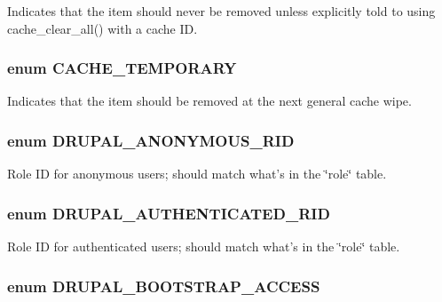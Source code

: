 Indicates that the item should never be removed unless explicitly told to using cache\_\-clear\_\-all() with a cache ID. \hypertarget{bootstrap_8inc_1f2558e91eb9f33d14168bb8dfd99690}{
\subsubsection[{CACHE\_\-TEMPORARY}]{\setlength{\rightskip}{0pt plus 5cm}enum {\bf CACHE\_\-TEMPORARY}}}
\label{bootstrap_8inc_1f2558e91eb9f33d14168bb8dfd99690}


Indicates that the item should be removed at the next general cache wipe. \hypertarget{bootstrap_8inc_c7816037c6b6b794a56dcce4dea70569}{
\subsubsection[{DRUPAL\_\-ANONYMOUS\_\-RID}]{\setlength{\rightskip}{0pt plus 5cm}enum {\bf DRUPAL\_\-ANONYMOUS\_\-RID}}}
\label{bootstrap_8inc_c7816037c6b6b794a56dcce4dea70569}


Role ID for anonymous users; should match what's in the \char`\"{}role\char`\"{} table. \hypertarget{bootstrap_8inc_c2d2d9cd4c8559510f9baa997525373e}{
\subsubsection[{DRUPAL\_\-AUTHENTICATED\_\-RID}]{\setlength{\rightskip}{0pt plus 5cm}enum {\bf DRUPAL\_\-AUTHENTICATED\_\-RID}}}
\label{bootstrap_8inc_c2d2d9cd4c8559510f9baa997525373e}


Role ID for authenticated users; should match what's in the \char`\"{}role\char`\"{} table. \hypertarget{bootstrap_8inc_1f2edb3f8e05ef17adfb116fa0cfac8e}{
\subsubsection[{DRUPAL\_\-BOOTSTRAP\_\-ACCESS}]{\setlength{\rightskip}{0pt plus 5cm}enum {\bf DRUPAL\_\-BOOTSTRAP\_\-ACCESS}}}
\label{bootstrap_8inc_1f2edb3f8e05ef17adfb116fa0cfac8e}


